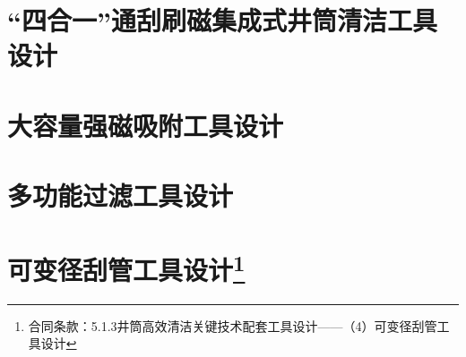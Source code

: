 \documentclass[12pt, a4paper, zihao=-4, openright]{ctexrep}
\begin{document}
\section{“四合一”通刮刷磁集成式井筒清洁工具设计}
\section{大容量强磁吸附工具设计}
	
\section{多功能过滤工具设计}
\section[可变径刮管工具设计]{可变径刮管工具设计\protect\footnote{合同条款：5.1.3井筒高效清洁关键技术配套工具设计——（4）可变径刮管工具设计}}
	

	
\end{document}
